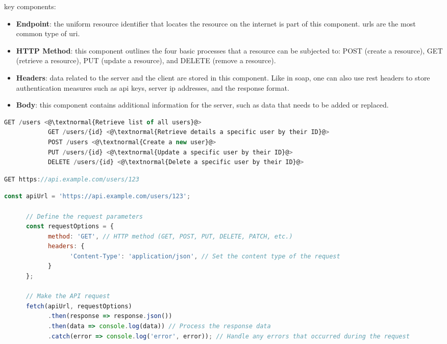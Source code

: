 \begin{multicols}{2}
      key components:
      \begin{itemize}
            \item \textbf{Endpoint}: the uniform resource identifier that locates the resource on the internet is
                  part of this component. \acrshort{url}s are the most common type of \acrshort{uri}.
            \item \textbf{HTTP Method}: this component outlines the four basic processes that a resource can be subjected
                  to: POST (create a resource), GET (retrieve a resource), PUT (update a resource), and DELETE
                  (remove a resource).
            \item \textbf{Headers}: data related to the server and the client are stored in this component. Like in
                  \acrshort{soap}, one can also use \acrshort{rest} headers to store authentication measures such as
                  \acrshort{api} keys, server \acrshort{ip} addresses, and the response format.
            \item \textbf{Body}: this component contains additional information for the server, such as data that needs to
                  be added or replaced.
      \end{itemize}
\end{multicols}
\begin{lstlisting}[language=JavaScript, caption=Different HTTP methods in REST]
            GET /users <@\textnormal{Retrieve list of all users}@>
            GET /users/{id} <@\textnormal{Retrieve details a specific user by their ID}@>
            POST /users <@\textnormal{Create a new user}@>
            PUT /users/{id} <@\textnormal{Update a specific user by their ID}@>
            DELETE /users/{id} <@\textnormal{Delete a specific user by their ID}@>
\end{lstlisting}
\begin{lstlisting}[language=JavaScript, caption=REST's Example Request]
            GET https://api.example.com/users/123
\end{lstlisting}
\begin{lstlisting}[language=JavaScript, caption=Example of REST request in JavaScript]
      const apiUrl = 'https://api.example.com/users/123';

      // Define the request parameters
      const requestOptions = {
            method: 'GET', // HTTP method (GET, POST, PUT, DELETE, PATCH, etc.)
            headers: {
                  'Content-Type': 'application/json', // Set the content type of the request
            }
      };

      // Make the API request
      fetch(apiUrl, requestOptions)
            .then(response => response.json())
            .then(data => console.log(data)) // Process the response data
            .catch(error => console.log('error', error)); // Handle any errors that occurred during the request
\end{lstlisting}
